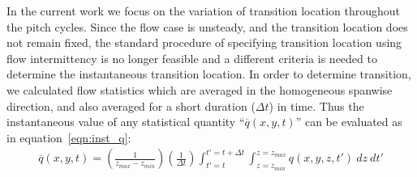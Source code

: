 In the current work we focus on the variation of transition location throughout the pitch cycles. Since the flow case is unsteady, and the transition location does not remain fixed, the standard procedure of specifying transition location using flow intermittency is no longer feasible and a different criteria is needed to determine the instantaneous transition location. In order to determine transition, we calculated flow statistics which are averaged in the homogeneous spanwise direction, and also averaged for a short duration ($\Delta t$) in time. Thus the instantaneous value of any statistical quantity ``$\overline{q}(x,y,t)$'' can be evaluated as in equation~\ref{eqn:inst_q}:
\begin{align}
	\overline{q}(x,y,t) = \left(\frac{1}{z_{max}-z_{min}}\right)\left(\frac{1}{\Delta t}\right)\int_{t'=t}^{t'=t+\Delta t}\int_{z=z_{min}}^{z=z_{max}}q(x,y,z,t')\ dz\ dt'
	\label{eqn:inst_q}
\end{align}

